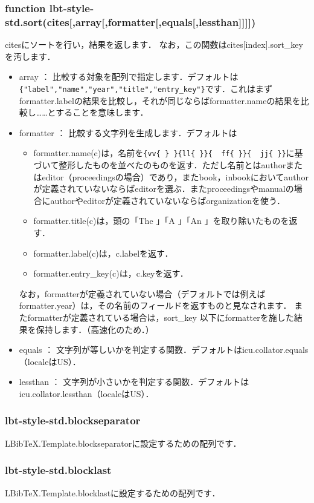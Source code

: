\documentclass[a4paper]{ltjsarticle}
\begin{document}
\subsubsection{function lbt-style-std.sort(cites[,array[,formatter[,equals[,lessthan]]]])}
citesにソートを行い，結果を返します．
なお，この関数はcites[index].sort\_keyを汚します．
\begin{itemize}
\item array ： 比較する対象を配列で指定します．デフォルトは\verb|{"label","name","year","title","entry_key"}|です．これはまずformatter.labelの結果を比較し，それが同じならばformatter.nameの結果を比較し……とすることを意味します．
\item formatter ： 比較する文字列を生成します．デフォルトは
\begin{itemize}
\item formatter.name(c)は，名前を\verb|{vv{ } }{ll{ }}{  ff{ }}{  jj{ }}|に基づいて整形したものを並べたのものを返す．ただし名前とはauthorまたはeditor（proceedingsの場合）であり，またbook，inbookにおいてauthorが定義されていないならばeditorを選ぶ．またproceedingsやmanualの場合にauthorやeditorが定義されていないならばorganizationを使う．
\item formatter.title(c)は，頭の「The 」「A 」「An 」を取り除いたものを返す．
\item formatter.label(c)は，c.labelを返す．
\item formatter.entry\_key(c)は，c.keyを返す．
\end{itemize}
なお，formatterが定義されていない場合（デフォルトでは例えばformatter.year）は，その名前のフィールドを返すものと見なされます．
またformatterが定義されている場合は，sort\_key 以下にformatterを施した結果を保持します．（高速化のため．）
\item equals ： 文字列が等しいかを判定する関数．デフォルトはicu.collator.equals（localeはUS）．
\item lessthan ： 文字列が小さいかを判定する関数．デフォルトはicu.collator.lessthan（localeはUS）．
\end{itemize}

\subsubsection{lbt-style-std.blockseparator}
LBibTeX.Template.blockseparatorに設定するための配列です．

\subsubsection{lbt-style-std.blocklast}
LBibTeX.Template.blocklastに設定するための配列です．
\end{document}
